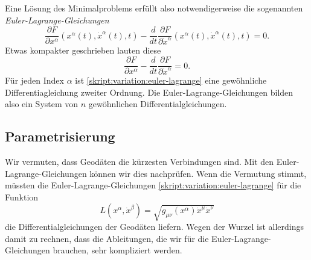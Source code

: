 Eine Lösung des Minimalproblems erfüllt also notwendigerweise die
sogenannten {\em Euler-Lagrange-Gleichungen}
%
\[
\frac{\partial F}{\partial x^\alpha}(x^\alpha(t), \dot x^\alpha(t), t)
-
\frac{d}{dt}\frac{\partial F}{\partial \dot x^\alpha}(x^\alpha(t), \dot x^\alpha(t), t)=0.
\]
Etwas kompakter geschrieben lauten diese
\begin{equation}
\frac{\partial F}{\partial x^\alpha}
-
\frac{d}{dt}\frac{\partial F}{\partial \dot x^\alpha}
=0.
\label{skript:variation:euler-lagrange}
\end{equation}
Für jeden Index $\alpha$ ist \eqref{skript:variation:euler-lagrange}
eine gewöhnliche Differentiagleichung zweiter Ordnung.
Die Euler-Lagrange-Gleichungen bilden also ein System von $n$ gewöhnlichen
Differentialgleichungen.

\subsection{Parametrisierung%
\label{skript:geodaeten:subsection:Parametrisierung}}
Wir vermuten, dass Geodäten die kürzesten Verbindungen sind.
Mit den Euler-Lagrange-Glei\-chung\-en können wir dies nachprüfen.
Wenn die Vermutung stimmt, müssten die Euler-Lagrange-Gleichungen 
\eqref{skript:variation:euler-lagrange}
für die Funktion
\[
L(x^\alpha, \dot x^\beta) =\sqrt{g_{\mu\nu}(x^\alpha)\dot x^\mu\dot x^\nu}
\]
die Differentialgleichungen der Geodäten liefern.
Wegen der Wurzel ist allerdings damit zu rechnen, dass die
Ableitungen, die wir für die Euler-Lagrange-Gleichungen brauchen, sehr
kompliziert werden.

